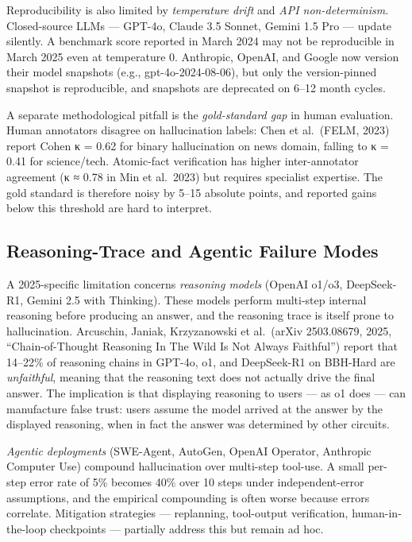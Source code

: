 \documentclass{article}
\begin{document}
Reproducibility is also limited by \emph{temperature drift} and \emph{API non-determinism}. Closed-source LLMs --- GPT-4o, Claude 3.5 Sonnet, Gemini 1.5 Pro --- update silently. A benchmark score reported in March 2024 may not be reproducible in March 2025 even at temperature 0. Anthropic, OpenAI, and Google now version their model snapshots (e.g., gpt-4o-2024-08-06), but only the version-pinned snapshot is reproducible, and snapshots are deprecated on 6--12 month cycles.

A separate methodological pitfall is the \emph{gold-standard gap} in human evaluation. Human annotators disagree on hallucination labels: Chen et al.~(FELM, 2023) report Cohen κ = 0.62 for binary hallucination on news domain, falling to κ = 0.41 for science/tech. Atomic-fact verification has higher inter-annotator agreement (κ ≈ 0.78 in Min et al.~2023) but requires specialist expertise. The gold standard is therefore noisy by 5--15 absolute points, and reported gains below this threshold are hard to interpret.

\subsection{Reasoning-Trace and Agentic Failure Modes}\label{reasoning-trace-and-agentic-failure-modes}

A 2025-specific limitation concerns \emph{reasoning models} (OpenAI o1/o3, DeepSeek-R1, Gemini 2.5 with Thinking). These models perform multi-step internal reasoning before producing an answer, and the reasoning trace is itself prone to hallucination. Arcuschin, Janiak, Krzyzanowski et al.~(arXiv 2503.08679, 2025, ``Chain-of-Thought Reasoning In The Wild Is Not Always Faithful'') report that 14--22\% of reasoning chains in GPT-4o, o1, and DeepSeek-R1 on BBH-Hard are \emph{unfaithful}, meaning that the reasoning text does not actually drive the final answer. The implication is that displaying reasoning to users --- as o1 does --- can manufacture false trust: users assume the model arrived at the answer by the displayed reasoning, when in fact the answer was determined by other circuits.

\emph{Agentic deployments} (SWE-Agent, AutoGen, OpenAI Operator, Anthropic Computer Use) compound hallucination over multi-step tool-use. A small per-step error rate of 5\% becomes 40\% over 10 steps under independent-error assumptions, and the empirical compounding is often worse because errors correlate. Mitigation strategies --- replanning, tool-output verification, human-in-the-loop checkpoints --- partially address this but remain ad hoc.
\end{document}
